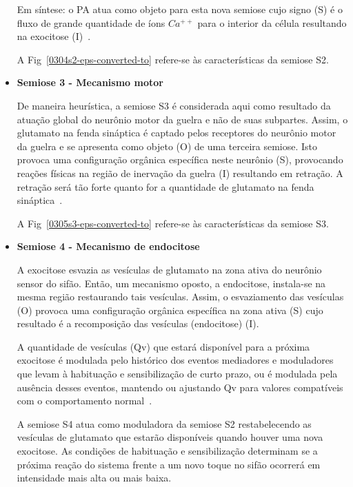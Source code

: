 \begin{itemize}
	Em síntese: o PA atua como objeto
	para esta nova semiose cujo signo (S) é o fluxo de grande quantidade de íons $Ca^{++}$ para o interior da célula resultando na exocitose (I)~\cite{kandel06, kandel00, lent01}.

	A Fig~\ref{0304s2-eps-converted-to} refere-se às características da semiose S2.

	\item \textbf{Semiose 3 - Mecanismo motor}


	De maneira heurística, a semiose S3 é considerada aqui como resultado da atuação global do neurônio motor da guelra e não de suas subpartes. Assim, o glutamato na fenda sináptica é captado pelos receptores do neurônio motor da guelra e se apresenta como objeto (O) de uma terceira semiose. Isto provoca uma configuração orgânica específica neste neurônio (S), provocando reações físicas na região de inervação da guelra (I) resultando  em retração. A retração será tão forte quanto for a quantidade de glutamato na fenda sináptica~\cite{kandel06,kandel00}.

	A Fig~\ref{0305s3-eps-converted-to} refere-se às características da semiose S3.

	\item \textbf{Semiose 4 - Mecanismo de endocitose}

	A exocitose esvazia as vesículas de glutamato na zona ativa do neurônio sensor do sifão. Então, um mecanismo oposto, a endocitose, instala-se na mesma região restaurando tais vesículas. Assim, o esvaziamento das vesículas (O) provoca uma configuração orgânica específica na zona ativa (S) cujo resultado é a recomposição das vesículas (endocitose) (I).


	A quantidade de vesículas (Qv) que estará disponível para a próxima exocitose é modulada pelo histórico dos eventos mediadores e moduladores que levam à habituação e sensibilização de curto prazo, ou é modulada pela ausência desses eventos, mantendo ou ajustando Qv para valores compatíveis com o comportamento normal~\cite{kandel06,kandel00}.

	A semiose S4 atua como moduladora da semiose S2 restabelecendo as vesículas de glutamato que estarão disponíveis quando houver uma nova exocitose. As condições de habituação e sensibilização determinam se a próxima reação do sistema frente a um novo toque no sifão ocorrerá em intensidade mais alta ou mais baixa.


\end{itemize}
